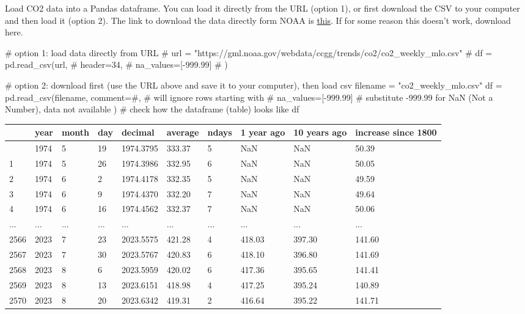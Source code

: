 \documentclass[
  letterpaper,
  DIV=11,
  numbers=noendperiod,
  oneside]{scrreprt}
\newenvironment{Shaded}{\begin{snugshade}}{\end{snugshade}}
\newcommand{\CommentTok}[1]{\textcolor[rgb]{0.37,0.37,0.37}{#1}}
\newcommand{\FloatTok}[1]{\textcolor[rgb]{0.68,0.00,0.00}{#1}}
\newcommand{\NormalTok}[1]{\textcolor[rgb]{0.00,0.23,0.31}{#1}}
\newcommand{\OperatorTok}[1]{\textcolor[rgb]{0.37,0.37,0.37}{#1}}
\newcommand{\StringTok}[1]{\textcolor[rgb]{0.13,0.47,0.30}{#1}}
\begin{document}
Load CO2 data into a Pandas dataframe. You can load it directly from the
URL (option 1), or first download the CSV to your computer and then load
it (option 2). The link to download the data directly form NOAA is
\href{https://gml.noaa.gov/webdata/ccgg/trends/co2/co2_weekly_mlo.csv}{this}.
If for some reason this doesn't work, download here.

\begin{Shaded}
\begin{Highlighting}[]
\CommentTok{\# option 1: load data directly from URL}
\CommentTok{\# url = "https://gml.noaa.gov/webdata/ccgg/trends/co2/co2\_weekly\_mlo.csv"}
\CommentTok{\# df = pd.read\_csv(url,}
\CommentTok{\#                  header=34,}
\CommentTok{\#                  na\_values=[{-}999.99]}
\CommentTok{\#                  )}

\CommentTok{\# option 2: download first (use the URL above and save it to your computer), then load csv}
\NormalTok{filename }\OperatorTok{=} \StringTok{"co2\_weekly\_mlo.csv"}
\NormalTok{df }\OperatorTok{=}\NormalTok{ pd.read\_csv(filename,}
\NormalTok{                comment}\OperatorTok{=}\StringTok{\textquotesingle{}\#\textquotesingle{}}\NormalTok{,  }\CommentTok{\# will ignore rows starting with \#}
\NormalTok{                 na\_values}\OperatorTok{=}\NormalTok{[}\OperatorTok{{-}}\FloatTok{999.99}\NormalTok{]  }\CommentTok{\# substitute {-}999.99 for NaN (Not a Number), data not available}
\NormalTok{                 )}
\CommentTok{\# check how the dataframe (table) looks like}
\NormalTok{df}
\end{Highlighting}
\end{Shaded}

\begin{longtable}[]{@{}llllllllll@{}}
\toprule\noalign{}
& year & month & day & decimal & average & ndays & 1 year ago & 10 years
ago & increase since 1800 \\
\midrule\noalign{}
\endhead
\bottomrule\noalign{}
\endlastfoot
0 & 1974 & 5 & 19 & 1974.3795 & 333.37 & 5 & NaN & NaN & 50.39 \\
1 & 1974 & 5 & 26 & 1974.3986 & 332.95 & 6 & NaN & NaN & 50.05 \\
2 & 1974 & 6 & 2 & 1974.4178 & 332.35 & 5 & NaN & NaN & 49.59 \\
3 & 1974 & 6 & 9 & 1974.4370 & 332.20 & 7 & NaN & NaN & 49.64 \\
4 & 1974 & 6 & 16 & 1974.4562 & 332.37 & 7 & NaN & NaN & 50.06 \\
... & ... & ... & ... & ... & ... & ... & ... & ... & ... \\
2566 & 2023 & 7 & 23 & 2023.5575 & 421.28 & 4 & 418.03 & 397.30 &
141.60 \\
2567 & 2023 & 7 & 30 & 2023.5767 & 420.83 & 6 & 418.10 & 396.80 &
141.69 \\
2568 & 2023 & 8 & 6 & 2023.5959 & 420.02 & 6 & 417.36 & 395.65 &
141.41 \\
2569 & 2023 & 8 & 13 & 2023.6151 & 418.98 & 4 & 417.25 & 395.24 &
140.89 \\
2570 & 2023 & 8 & 20 & 2023.6342 & 419.31 & 2 & 416.64 & 395.22 &
141.71 \\
\end{longtable}
\end{document}
